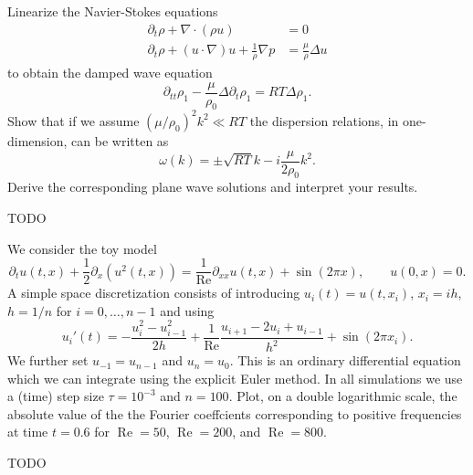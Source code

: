 \documentclass[12pt]{exam}
\newcommand{\del}{\partial}
\begin{document}
\begin{questions}
    
    \question Linearize the Navier-Stokes equations
    \begin{align*}
        \del_t \rho + \nabla \cdot (\rho u) &= 0 \\
        \del_t \rho + (u \cdot \nabla) u + \frac{1}{\rho} \nabla p &= \frac{\mu}{\rho} \Delta u
    \end{align*}
    to obtain the damped wave equation
    \begin{equation*}
        \del_{tt} \rho_1 - \frac{\mu}{\rho_0} \Delta \del_t \rho_1 = RT \Delta \rho_1.
    \end{equation*}
    Show that if we assume $(\mu / \rho_0)^2 k^2 \ll RT$ the dispersion relations, in one-dimension, can be written as
    \begin{equation*}
        \omega(k) = \pm \sqrt{RT}k - i \frac{\mu}{2 \rho_0} k^2.
    \end{equation*}
    Derive the corresponding plane wave solutions and interpret your results.
    
    \begin{solution}
        {\color{red} TODO}
    \end{solution}
    
    
    \question We consider the toy model
    \begin{equation*}
        \del_t u(t,x) + \frac{1}{2} \del_x(u^2(t,x)) = \frac{1}{\text{Re}} \del_{xx} u(t,x) + \sin(2 \pi x), \qquad u(0,x) = 0.
    \end{equation*}
    A simple space discretization consists of introducing $u_i(t) = u(t, x_i)$, $x_i = ih$, $h = 1/n$ for $i = 0, \ldots, n - 1$ and using
    \begin{equation*}
        u_i'(t) = - \frac{u_i^2 - u_{i-1}^2}{2h} + \frac{1}{\text{Re}} \frac{u_{i+1} - 2u_i + u_{i-1}}{h^2} + \sin(2 \pi x_i).
    \end{equation*}
    We further set $u_{-1} = u_{n-1}$ and $u_n = u_0$. This is an ordinary differential equation which we can integrate using the explicit Euler method. In all simulations we use a (time) step size $\tau = 10^{-3}$ and $n = 100$. \newline
    Plot, on a double logarithmic scale, the absolute value of the the Fourier coeffcients corresponding to positive frequencies at time $t = 0.6$ for $\operatorname{Re} = 50$, $\operatorname{Re} = 200$, and $\operatorname{Re} = 800$.
    
    \begin{solution}
        {\color{red} TODO}
    \end{solution}
    
\end{questions}
\end{document}
